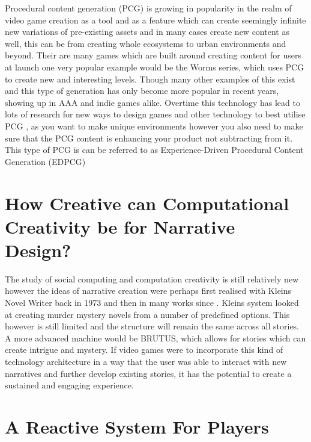 \documentclass{scrartcl}
\begin{document}
Procedural content generation (PCG) is growing in popularity in the realm of video game creation as a tool and as a feature which can create seemingly infinite new variations of pre-existing assets and in many cases create new content as well, this can be from creating whole ecosystems to urban environments and beyond. \cite{hendrikx2013procedural} Their are many games which are built around creating content for users at launch one very popular example would be the Worms series, which uses PCG to create new and interesting levels. \cite{team1995worms} Though many other examples of this exist and this type of generation has only become more popular in recent years, showing up in AAA and indie games alike. \cite{ubisoft2008farcry} \cite{mojang2011minecraft} Overtime this technology has lead to lots of research for new ways to design games and other technology to best utilise PCG \cite{smith2012pcg}, as you want to make unique environments however you also need to make sure that the PCG content is enhancing your product not subtracting from it. This type of PCG is can be referred to as Experience-Driven Procedural Content Generation (EDPCG) \cite{craveirinha2015designing}


\section{How Creative can Computational Creativity be for Narrative Design?}

The study of social computing and computation creativity is still relatively new however the ideas of narrative creation were perhaps first realised with Kleins Novel Writer \cite{klein1973automatic} back in 1973 and then in many works since \cite{gervas2009storytelling}. Kleins system looked at creating murder mystery novels from a number of predefined options. This however is still limited and the structure will remain the same across all stories. A more advanced machine would be BRUTUS, \cite{bringsjord2000artificial} which allows for stories which can create intrigue and mystery. If video games were to incorporate this kind of technology architecture in a way that the user was able to interact with new narratives and further develop existing stories, it has the potential to create a sustained and engaging experience.

\section{A Reactive System For Players}
\end{document}
